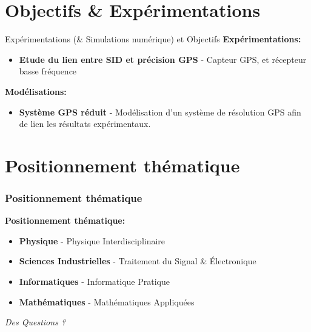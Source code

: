 \documentclass[xcolor=dvipsnames,envcountsect]{beamer}
\renewcommand{\indent}{\hspace*{2em}}
\begin{document}
\section{Objectifs \& Expérimentations}
\begin{frame}{Expérimentations (\& Simulations numérique) et Objectifs}
        \textbf{Expérimentations:} 
	    \begin{itemize}
            \item \textbf{Etude du lien entre SID et précision GPS} - Capteur GPS, et récepteur basse fréquence
        \end{itemize}
        \textbf{Modélisations:} 
	    \begin{itemize}
            \item \textbf{Système GPS réduit} - Modélisation d'un système de résolution GPS afin de lien les résultats expérimentaux.
        \end{itemize}
\end{frame}
\section{Positionnement thématique}
\begin{frame}
	\frametitle{Positionnement thématique}
		\justifying
		\textbf{Positionnement thématique:}
		\begin{itemize}
            \item \textbf{Physique} - Physique Interdisciplinaire
            \item \textbf{Sciences Industrielles} - Traitement du Signal \& Électronique
            \item \textbf{Informatiques} - Informatique Pratique
            \item \textbf{Mathématiques} - Mathématiques Appliquées
        \end{itemize}
\end{frame}

\begin{frame}
	\cite{knuthwebsite}
	\printbibliography
\end{frame}
\begin{frame}
		\centering
		\begin{block}
			\scshape
				\begin{center}
					\Huge\emph{Des Questions ?}
				\end{center}
		\end{block}
\end{frame}
\end{document}
